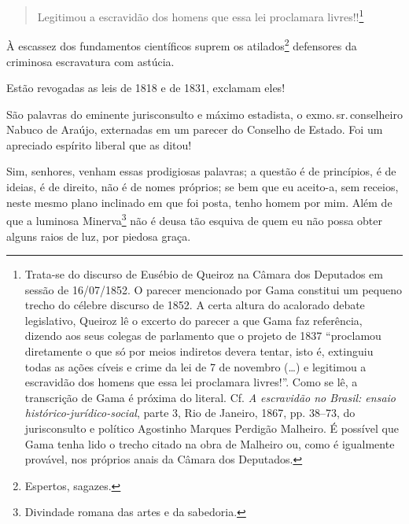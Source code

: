 {\begin{quote}
Legitimou a escravidão dos homens que essa lei proclamara
livres!!\footnote{Trata-se do discurso de Eusébio de Queiroz na
  Câmara dos Deputados em sessão de 16/07/1852. O parecer mencionado por
  Gama constitui um pequeno trecho do célebre discurso de 1852. A certa
  altura do acalorado debate legislativo, Queiroz lê o excerto do
  parecer a que Gama faz referência, dizendo aos seus colegas de
  parlamento que o projeto de 1837 ``proclamou diretamente o que só por
  meios indiretos devera tentar, isto é, extinguiu todas as ações cíveis
  e crime da lei de 7 de novembro (\ldots{}) e legitimou a escravidão
  dos homens que essa lei proclamara livres!''. Como se lê, a transcrição
  de Gama é próxima do literal. Cf. \emph{A escravidão no Brasil: ensaio
  histórico-jurídico-social}, parte 3, Rio de Janeiro, 1867, pp. 38--73,
  do jurisconsulto e político Agostinho Marques Perdigão Malheiro. É
 possível que Gama tenha lido o trecho citado na obra de
  Malheiro ou, como é igualmente provável, nos próprios anais da Câmara
  dos Deputados.}
\end{quote}

À escassez dos fundamentos científicos suprem os atilados\footnote{
  Espertos, sagazes.} defensores da criminosa escravatura com astúcia.

Estão revogadas as leis de 1818 e de 1831, exclamam eles!

São palavras do eminente jurisconsulto e máximo estadista, o exmo.\,sr.\,conselheiro Nabuco de Araújo, externadas em um parecer do Conselho de
Estado. Foi um apreciado espírito liberal que as ditou!

Sim, senhores, venham essas prodigiosas palavras; a questão é de
princípios, é de ideias, é de direito, não é de nomes próprios; se bem
que eu aceito-a, sem receios, neste mesmo plano inclinado em que foi
posta, tenho homem por mim. Além de que a luminosa Minerva\footnote{
  Divindade romana das artes e da sabedoria.} não é deusa tão esquiva de
quem eu não possa obter alguns raios de luz, por piedosa graça.

}
